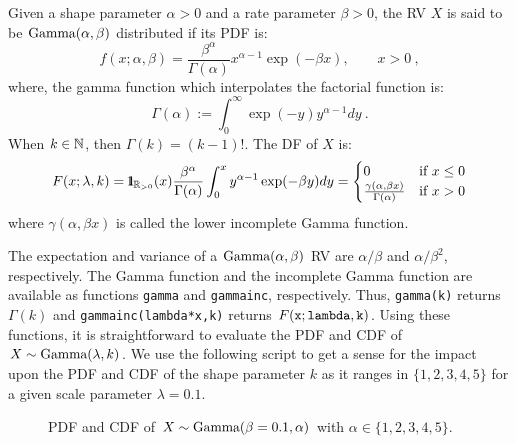 \begin{model}
Given a shape parameter $\alpha>0$ and a rate parameter $\beta>0$, the RV $X$ is said to be $\mbox{{\rm Gamma}}(\alpha,\beta)$ distributed if its PDF is:
\[
f(x;\alpha,\beta) = \frac{\beta^{\alpha}}{\Gamma(\alpha)} x^{\alpha-1} \exp(-\beta x), \qquad x > 0 \ ,
\]
where, the gamma function which interpolates the factorial function is:
\[
\Gamma(\alpha) := \int_0^{\infty} \exp(-y) y^{\alpha-1} dy \ .
\]
When $k \in \mathbb{N}$, then $\Gamma(k)=(k-1)!$.  The DF of $X$ is:
\[
F(x;\lambda,k) = {1}\mspace{-11 mu}{1}_{\mathbb{R}_{>0}}(x) \frac{\beta^{\alpha}}{\Gamma(\alpha)} \int_0^{x} y^{\alpha-1} \exp(-\beta y) dy =
\begin{cases}
0 & \text{if } x \leq 0 \\
 \frac{\gamma(\alpha,\beta x)}{\Gamma(\alpha)} & \text{if } x > 0
\end{cases}
\]
where $\gamma(\alpha,\beta x)$ is called the lower incomplete Gamma function.
\end{model}
The expectation and variance of a $\mbox{{\rm Gamma}}(\alpha,\beta)$ RV are $\alpha/\beta$ and $\alpha/\beta^2$, respectively.
The Gamma function and the incomplete Gamma function are available as \Matlab functions {\tt gamma} and {\tt gammainc}, respectively.  Thus, {\tt gamma(k)} returns $\Gamma(k)$ and {\tt gammainc(lambda*x,k)} returns $F({\tt x};{\tt lambda},{\tt k})$.  Using these functions, it is straightforward to evaluate the PDF and CDF of $X \sim \mbox{{\rm Gamma}}(\lambda,k)$.  We use the following script to get a sense for the impact upon the PDF and CDF of the shape parameter $k$ as it ranges in $\{1,2,3,4,5\}$ for a given scale parameter $\lambda=0.1$.

\begin{figure}[htpb]
\caption{PDF and CDF of $X \sim \mbox{{\rm Gamma}}(\beta=0.1,\alpha)$ with $\alpha \in \{1,2,3,4,5\}$.\label{F:PlotPdfCdfGamma}}
\centering   {}
\end{figure}


